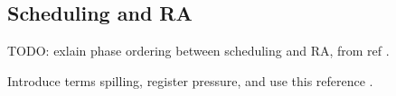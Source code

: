 

\subsection{Scheduling and RA}
TODO: exlain phase ordering between scheduling and RA, from ref \cite[Chapter~10.2.4]{dragon_book}.

Introduce terms spilling, register pressure, and use this reference \cite{ra}.




%





